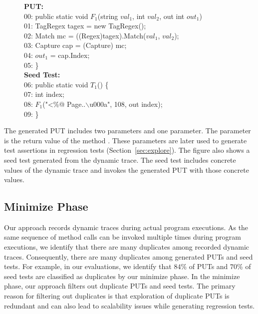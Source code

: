 \begin{figure}[t]
\begin{CodeOut}
\textbf{PUT:}\\
00: public static void $F_1$(string $val_1$, int $val_2$, out int $out_1$)\\
01: \hspace*{0.2in}TagRegex tagex = new TagRegex();\\
02: \hspace*{0.2in}Match mc = ((Regex)tagex).Match($val_1$, $val_2$);\\
03: \hspace*{0.2in}Capture cap = (Capture) mc;\\
04: \hspace*{0.2in}$out_1$ = cap.Index;\\
05: \}\\

\textbf{Seed Test:}\\
06: public static void $T_1$() \{\\
07: \hspace*{0.2in}int index;\\
08: \hspace*{0.2in}$F_1$("<\%@ Page..$\backslash$u000a", 108, out index);\\
09: \}\\
\end{CodeOut}\vspace*{-3ex}
\vspace*{-3ex}
\end{figure}

The generated PUT includes two parameters and one  parameter. The  parameter is the return value of the method . These  parameters are later used to generate test assertions in regression tests (Section~\ref{sec:explore}). The figure also shows a seed test generated from the dynamic trace. 
The seed test includes concrete values of the dynamic trace and invokes the generated PUT with those concrete values.

\subsection{Minimize Phase}
\label{sec:minimize}

Our approach records dynamic traces during actual program executions. As the same sequence of method calls can be invoked multiple times during program executions,
we identify that there are many duplicates among recorded dynamic traces. Consequently, there are many duplicates among generated PUTs and seed tests. For example, in our evaluations, we identify that $84$\% of PUTs and $70$\% of seed tests are classified as duplicates by our minimize phase. In the minimize phase, our approach filters out duplicate PUTs and seed tests. The primary reason for filtering out duplicates is that exploration of duplicate PUTs is redundant and can also lead to scalability issues while generating regression tests.

